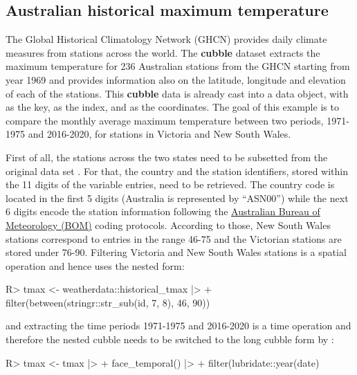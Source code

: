 \documentclass[
]{jss}
\begin{document}
\hypertarget{australian-historical-maximum-temperature}{%
\subsection{Australian historical maximum temperature}\label{australian-historical-maximum-temperature}}

The Global Historical Climatology Network (GHCN) provides daily climate measures from stations across the world. The \textbf{cubble} dataset  extracts the maximum temperature for 236 Australian stations from the GHCN starting from year 1969 and provides information also on the latitude, longitude and elevation of each of the stations. This \textbf{cubble} data is already cast into a  data object, with  as the key,  as the index, and  as the coordinates. The goal of this example is to compare the monthly average maximum temperature between two periods, 1971-1975 and 2016-2020, for stations in Victoria and New South Wales.

First of all, the stations across the two states need to be subsetted from the original data set . For that, the country and the station identifiers, stored within the 11 digits of the  variable entries, need to be retrieved. The country code is located in the first 5 digits (Australia is represented by ``ASN00'') while the next 6 digits encode the station information following the \href{http://www.bom.gov.au/climate/cdo/about/site-num.shtml}{Australian Bureau of Meteorology (BOM)} coding protocols. According to those, New South Wales stations correspond to entries in the range 46-75 and the Victorian stations are stored under 76-90. Filtering Victoria and New South Wales stations is a spatial operation and hence uses the  nested form:

\begin{CodeChunk}
\begin{CodeInput}
R> tmax <- weatherdata::historical_tmax |>
+   filter(between(stringr::str_sub(id, 7, 8), 46, 90))
\end{CodeInput}
\end{CodeChunk}

and extracting the time periods 1971-1975 and 2016-2020 is a time operation and therefore the nested cubble needs to be switched to the long cubble form by :

\begin{CodeChunk}
\begin{CodeInput}
R> tmax <- tmax |>
+   face_temporal() |>
+   filter(lubridate::year(date) %
\end{CodeInput}
\end{CodeChunk}
\end{document}

